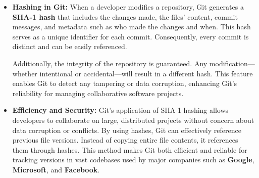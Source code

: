 \documentclass[11pt,a4paper]{article}
\begin{document}
    \begin{itemize}
        \item \textbf{Hashing in Git:}
        \newline
        When a developer modifies a repository, Git generates a \textbf{SHA-1 hash} that includes the changes made, the files' content, commit messages, and metadata such as who made the changes and when. This hash serves as a unique identifier for each commit. Consequently, every commit is distinct and can be easily referenced.
        \par
        Additionally, the integrity of the repository is guaranteed. Any modification—whether intentional or accidental—will result in a different hash. This feature enables Git to detect any tampering or data corruption, enhancing Git’s reliability for managing collaborative software projects.


        \item \textbf{Efficiency and Security:}
        \newline
        Git’s application of SHA-1 hashing allows developers to collaborate on large, distributed projects without concern about data corruption or conflicts. By using hashes, Git can effectively reference previous file versions. Instead of copying entire file contents, it references them through hashes. This method makes Git both efficient and reliable for tracking versions in vast codebases used by major companies such as \textbf{Google}, \textbf{Microsoft}, and \textbf{Facebook}.

    \end{itemize}
\end{document}
